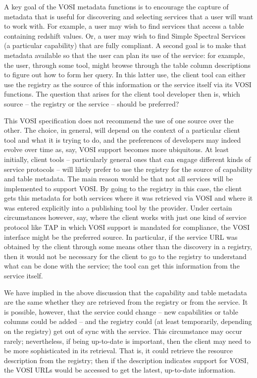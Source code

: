 \documentclass[11pt,letter]{ivoa}
\begin{document}
A key goal of the VOSI metadata functions is to encourage the capture of
metadata that is useful for discovering and selecting services that a
user will want to work with. For example, a user may wish to find
services that access a table containing redshift values. Or, a user may
wish to find Simple Spectral Services (a particular capability) that are
fully compliant. A second goal is to make that metadata available so
that the user can plan its use of the service: for example, the user,
through some tool, might browse through the table column descriptions to
figure out how to form her query. In this latter use, the client tool
can either use the registry as the source of this information or the
service itself via its VOSI functions. The question that arises for the
client tool developer then is, which source -- the registry or the
service -- should be preferred?

This VOSI specification does not recommend the use of one source over
the other. The choice, in general, will depend on the context of a
particular client tool and what it is trying to do, and the preferences
of developers may indeed evolve over time as, say, VOSI support becomes
more ubiquitous. At least initially, client tools -- particularly
general ones that can engage different kinds of service protocols --
will likely prefer to use the registry for the source of capability and
table metadata. The main reason would be that not all services will be
implemented to support VOSI. By going to the registry in this case, the
client gets this metadata for both services where it was retrieved via
VOSI and where it was entered explicitly into a publishing tool by the
provider. Under certain circumstances however, say, where the client
works with just one kind of service protocol like TAP in which VOSI
support is mandated for compliance, the VOSI interface might be the
preferred source. In particular, if the service URL was obtained by the
client through some means other than the discovery in a registry, then
it would not be necessary for the client to go to the registry to
understand what can be done with the service; the tool can get this
information from the service itself. 

We have implied in the above discussion that the capability and table
metadata are the same whether they are retrieved from the registry or
from the service. It is possible, however, that the service could change
-- new capabilities or table columns could be added -- and the registry
could (at least temporarily, depending on the registry) get out of sync
with the service. This circumstance may occur rarely; nevertheless, if
being up-to-date is important, then the client may need to be more
sophisticated in its retrieval. That is, it could retrieve the resource
description from the registry; then if the description indicates support
for VOSI, the VOSI URLs would be accessed to get the latest, up-to-date
information. 
\end{document}
